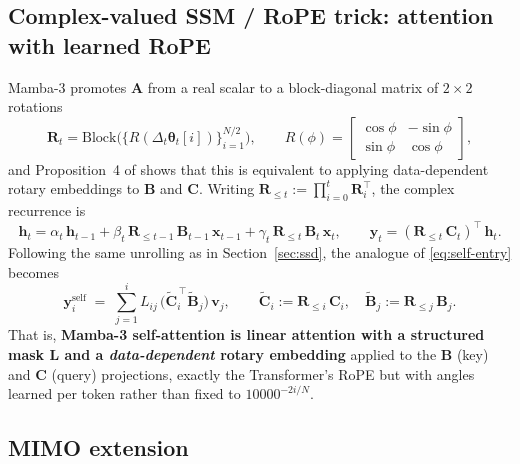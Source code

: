 \documentclass[11pt,a4paper]{article}
\begin{document}
\subsection{Complex-valued SSM / RoPE trick: attention with learned RoPE}
\label{sec:rope}

Mamba-3 promotes $\bm{A}$ from a real scalar to a block-diagonal
matrix of $2{\times}2$ rotations
\begin{equation}\label{eq:Rdef}
  \bm{R}_t = \mathrm{Block}\bigl(\{R(\Delta_t\bm{\theta}_t[i])\}_{i=1}^{N/2}\bigr),
  \qquad
  R(\phi) = \begin{bmatrix}\cos\phi & -\sin\phi\\ \sin\phi & \cos\phi\end{bmatrix},
\end{equation}
and Proposition~4 of \cite{mamba3} shows that this is equivalent
to applying data-dependent rotary embeddings to $\bm{B}$ and $\bm{C}$.
Writing $\bm{R}_{\le t} := \prod_{i=0}^{t}\bm{R}_i^\top$, the complex
recurrence is
\begin{equation}\label{eq:complex-rec}
  \bm{h}_t = \alpha_t\,\bm{h}_{t-1}
            + \beta_t\,\bm{R}_{\le t-1}\,\bm{B}_{t-1}\,\bm{x}_{t-1}
            + \gamma_t\,\bm{R}_{\le t}\,\bm{B}_{t}\,\bm{x}_{t},
\qquad
  \bm{y}_t = (\bm{R}_{\le t}\,\bm{C}_t)^\top\,\bm{h}_t.
\end{equation}
Following the same unrolling as in Section~\ref{sec:ssd}, the
analogue of \eqref{eq:self-entry} becomes
\begin{equation}\label{eq:self-rope}
  \bm{y}_i^{\text{self}}
     \;=\; \sum_{j=1}^{i} L_{ij}\,
            \bigl(\widetilde{\bm{C}}_i^{\,\top}\widetilde{\bm{B}}_j\bigr)\,\bm{v}_j,
  \qquad
  \widetilde{\bm{C}}_i := \bm{R}_{\le i}\,\bm{C}_i,\quad
  \widetilde{\bm{B}}_j := \bm{R}_{\le j}\,\bm{B}_j.
\end{equation}
That is, \textbf{Mamba-3 self-attention is linear attention with a
structured mask $\bm{L}$ and a \emph{data-dependent} rotary embedding}
applied to the $\bm{B}$ (key) and $\bm{C}$ (query) projections,
exactly the Transformer's RoPE but with angles learned per token
rather than fixed to $10000^{-2i/N}$.

\subsection{MIMO extension}\label{sec:mimo}
\end{document}
